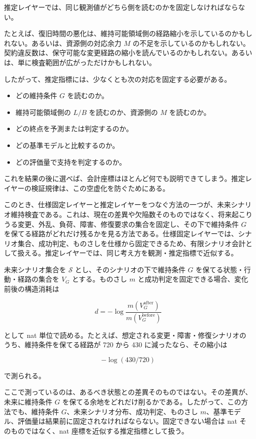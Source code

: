 \documentclass[12pt,a4paper]{article}
\begin{document}
推定レイヤーでは、同じ観測値がどちら側を読むのかを固定しなければならない。

たとえば、復旧時間の悪化は、維持可能領域側の経路縮小を示しているのかもしれない。あるいは、資源側の対応余力 \(M\) の不足を示しているのかもしれない。契約違反数は、保守可能な変更経路の縮小を読んでいるのかもしれない。あるいは、単に検査範囲が広がっただけかもしれない。

したがって、推定指標には、少なくとも次の対応を固定する必要がある。

\begin{itemize}
\tightlist
\item
  どの維持条件 \(G\) を読むのか。
\item
  維持可能領域側の \(L/B\) を読むのか、資源側の \(M\) を読むのか。
\item
  どの終点を予測または判定するのか。
\item
  どの基準モデルと比較するのか。
\item
  どの評価量で支持を判定するのか。
\end{itemize}

これを結果の後に選べば、会計座標はほとんど何でも説明できてしまう。推定レイヤーの検証規律は、この空虚化を防ぐためにある。

このとき、仕様固定レイヤーと推定レイヤーをつなぐ方法の一つが、未来シナリオ維持検査である。これは、現在の差異や欠陥数そのものではなく、将来起こりうる変更、外乱、負荷、障害、修復要求の集合を固定し、その下で維持条件 \(G\) を保てる経路がどれだけ残るかを見る方法である。仕様固定レイヤーでは、シナリオ集合、成功判定、ものさしを仕様から固定できるため、有限シナリオ会計として扱える。推定レイヤーでは、同じ考え方を観測・推定指標で近似する。

未来シナリオ集合を \(\mathcal S\) とし、そのシナリオの下で維持条件 \(G\) を保てる状態・行動・経路の集合を \(V_{G}\) とする。ものさし \(m\) と成功判定を固定できる場合、変化前後の構造消耗は

\[
d=-\log\frac{m(V_{G}^{\mathrm{after}})}{m(V_{G}^{\mathrm{before}})}
\]

として nat 単位で読める。たとえば、想定される変更・障害・修復シナリオのうち、維持条件を保てる経路が 720 から 430 に減ったなら、その縮小は

\[
-\log(430/720)
\]

で測られる。

ここで測っているのは、あるべき状態との差異そのものではない。その差異が、未来に維持条件 \(G\) を保てる余地をどれだけ削るかである。したがって、この方法でも、維持条件 \(G\)、未来シナリオ分布、成功判定、ものさし \(m\)、基準モデル、評価量は結果前に固定されなければならない。固定できない場合は nat そのものではなく、nat 座標を近似する推定指標として扱う。
\end{document}

